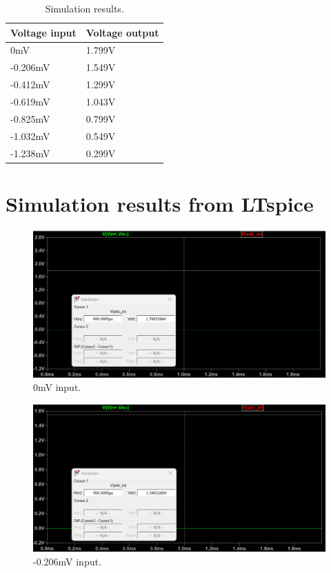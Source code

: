 \begin{table}[h]
    \begin{center}
    \begin{tabular}{|l|l|}
        \hline
        Voltage input & Voltage output \\
        \hline
        0mV & 1.799V \\
        -0.206mV & 1.549V \\
        -0.412mV & 1.299V \\
        -0.619mV & 1.043V \\
        -0.825mV & 0.799V \\
        -1.032mV & 0.549V \\
        -1.238mV & 0.299V \\
        \hline
    \end{tabular}
    \caption{Simulation results.}
    \label{table:simulation}
    \end{center}
\end{table}



\chapter{Simulation results from LTspice}


\begin{figure}[h]
\centering
\includegraphics[width=\textwidth]{proposal/parts/0mV.png}
\caption{0mV input.}
\end{figure}

\begin{figure}[h]
\centering
\includegraphics[width=\textwidth]{proposal/parts/-0.206mV.png}
\caption{-0.206mV input.}
\end{figure}

